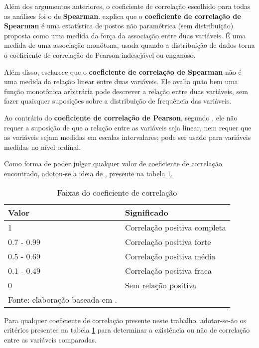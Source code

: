 Além dos argumentos anteriores, o coeficiente de correlação escolhido para todas as análises foi o de \textbf{Spearman}. \cite{hauke2011comparison} explica que o \textbf{coeficiente de correlação de Spearman} é uma estatística de postos não paramétrica (sem distribuição) proposta como uma medida da força da associação entre duas variáveis. É uma medida de uma associação monótona, usada quando a distribuição de dados torna o coeficiente de correlação de Pearson indesejável ou enganoso. 

Além disso, \cite{hauke2011comparison} esclarece que o \textbf{coeficiente de correlação de Spearman} não é uma medida da relação linear entre duas variáveis. Ele avalia quão bem uma função monotônica arbitrária pode descrever a relação entre duas variáveis, sem fazer quaisquer suposições sobre a distribuição de frequência das variáveis.

Ao contrário do \textbf{coeficiente de correlação de Pearson}, segundo \cite{hauke2011comparison}, ele não requer a suposição de que a relação entre as variáveis seja linear, nem requer que as variáveis sejam medidas em escalas intervalares; pode ser usado para variáveis medidas no nível ordinal.

Como forma de poder julgar qualquer valor de coeficiente de correlação encontrado, adotou-se a ideia de \cite{ali2022spearman}, presente na tabela \ref{tab:faixas-coeficiente-correlacao}.

\begin{table}[H]
\caption{Faixas do coeficiente de correlação}
\begin{tabular}{@{}ll@{}}
\toprule
Valor      & Significado                  \\ \midrule
1          & Correlação positiva completa \\ \midrule
0.7 - 0.99 & Correlação positiva forte    \\ \midrule
0.5 - 0.69 & Correlação positiva média    \\ \midrule
0.1 - 0.49 & Correlação positiva fraca    \\ \midrule
0          & Sem relação positiva  \\ \midrule      
\label{tab:faixas-coeficiente-correlacao}
\footnotesize{Fonte: elaboração baseada em \cite{ali2022spearman}.}  
\end{tabular}
\end{table}

Para qualquer coeficiente de correlação presente neste trabalho, adotar-se-ão os critérios presentes na tabela \ref{tab:faixas-coeficiente-correlacao} para determinar a existência ou não de correlação entre as variáveis comparadas.

